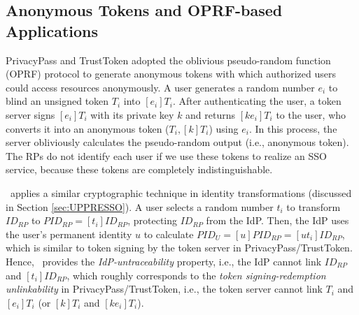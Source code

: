 \newc

\subsection{Anonymous Tokens and OPRF-based Applications}
\label{sec:related}

PrivacyPass and TrustToken \cite{privacypass,trusttoken} adopted the oblivious pseudo-random function (OPRF) protocol \cite{oprf-proved,voprf-proved,oprf-bitcoin-wallet} to generate anonymous tokens with which authorized users could access resources anonymously.
A user generates a random number $e_i$ to blind an unsigned token $T_i$ into $[e_i]T_i$. After authenticating the user, a token server signs $[e_i]T_i$ with its private key $k$ and returns $[k e_i]T_i$ to the user, who converts it into an anonymous token  ($T_i, [k]T_i$) using $e_i$. In this process, the server obliviously calculates the pseudo-random output (i.e., anonymous token).
The RPs do not identify each user if we use these tokens to realize an SSO service, because these tokens are completely indistinguishable.

\usso\ applies a similar cryptographic technique in identity transformations  (discussed in Section \ref{sec:UPPRESSO}).
 A user selects a random number $t_i$ to transform $ID_{RP}$ to $PID_{RP} = [t_i]ID_{RP}$, protecting $ID_{RP}$ from the IdP.
Then, the IdP uses the user's permanent identity $u$ to calculate $PID_U = [u]PID_{RP} = [ut_i]ID_{RP}$,
which is similar to token signing by the token server in PrivacyPass/TrustToken. Hence, \usso\ provides the \emph{IdP-untraceability} property, i.e., the IdP cannot link $ID_{RP}$ and $[t_i]ID_{RP}$, which roughly corresponds to the {\em token signing-redemption unlinkability} in PrivacyPass/TrustToken, i.e., the token server cannot link $T_i$ and $[e_i]T_i$ (or $[k]T_i$ and $[ke_i]T_i$). %

